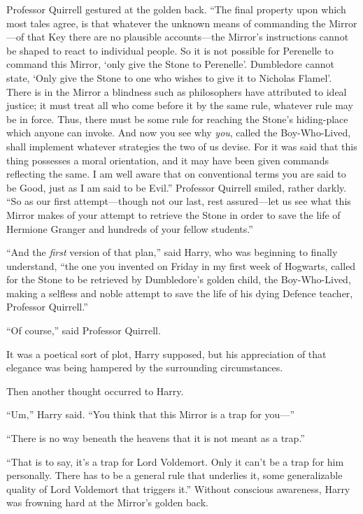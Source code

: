 Professor Quirrell gestured at the golden back. “The final property upon which most tales agree, is that whatever the unknown means of commanding the Mirror—of that Key there are no plausible accounts—the Mirror’s instructions cannot be shaped to react to individual people. So it is not possible for Perenelle to command this Mirror, ‘only give the Stone to Perenelle’. Dumbledore cannot state, ‘Only give the Stone to one who wishes to give it to Nicholas Flamel’. There is in the Mirror a blindness such as philosophers have attributed to ideal justice; it must treat all who come before it by the same rule, whatever rule may be in force. Thus, there must be some rule for reaching the Stone’s hiding-place which anyone can invoke. And now you see why \emph{you}, called the Boy-Who-Lived, shall implement whatever strategies the two of us devise. For it was said that this thing possesses a moral orientation, and it may have been given commands reflecting the same. I am well aware that on conventional terms you are said to be Good, just as I am said to be Evil.” Professor Quirrell smiled, rather darkly. “So as our first attempt—though not our last, rest assured—let us see what this Mirror makes of your attempt to retrieve the Stone in order to save the life of Hermione Granger and hundreds of your fellow students.”

“And the \emph{first} version of that plan,” said Harry, who was beginning to finally understand, “the one you invented on Friday in my first week of Hogwarts, called for the Stone to be retrieved by Dumbledore’s golden child, the Boy-Who-Lived, making a selfless and noble attempt to save the life of his dying Defence teacher, Professor Quirrell.”

“Of course,” said Professor Quirrell.

It was a poetical sort of plot, Harry supposed, but his appreciation of that elegance was being hampered by the surrounding circumstances.

Then another thought occurred to Harry.

“Um,” Harry said. “You think that this Mirror is a trap for you—”

“There is no way beneath the heavens that it is not meant as a trap.”

“That is to say, it’s a trap for Lord Voldemort. Only it can’t be a trap for him personally. There has to be a general rule that underlies it, some generalizable quality of Lord Voldemort that triggers it.” Without conscious awareness, Harry was frowning hard at the Mirror’s golden back.

